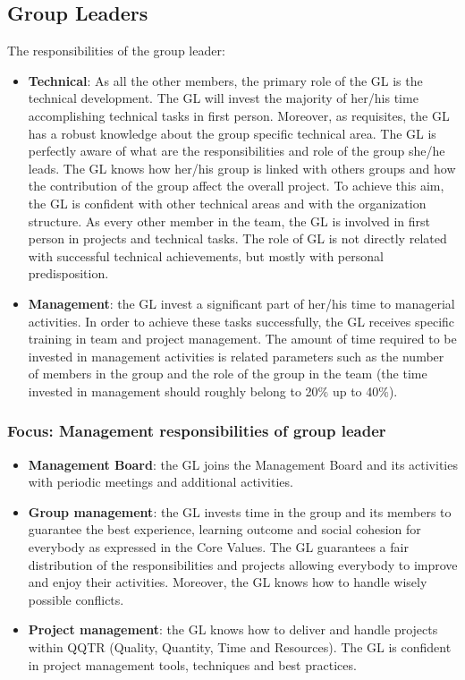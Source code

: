 \documentclass[graybox]{svmult}
\begin{document}
\subsection{Group Leaders}
The responsibilities of the group leader:
\begin{itemize}
\item \textbf{Technical}: As all the other members, the primary role of the GL is the technical development. The GL will invest the majority of her/his time accomplishing technical tasks in first person. Moreover, as requisites, the GL has a robust knowledge about the group specific technical area. The GL is perfectly aware of what are the responsibilities and role of the group she/he leads. The GL knows how her/his group is linked with others groups and how the contribution of the group affect the overall project. To achieve this aim, the GL is confident with other technical areas and with the organization structure. As every other member in the team, the GL is involved in first person in projects and technical tasks. The role of GL is not directly related with successful technical achievements, but mostly with personal predisposition.
\item \textbf{Management}: the GL invest a significant part of her/his time to managerial activities. In order to achieve these tasks successfully, the GL receives specific training in team and project management. The amount of time required to be invested in management activities is related parameters such as the number of members in the group and the role of the group in the team (the time invested in management should roughly belong to 20$\%$ up to 40$\%$).
\end{itemize}

\subsubsection{Focus: Management responsibilities of group leader}
\begin{itemize}
\item \textbf{Management Board}: the GL joins the Management Board and its activities with periodic meetings and additional activities.
\item \textbf{Group management}: the GL invests time in the group and its members to guarantee the best experience, learning outcome and social cohesion for everybody as expressed in the Core Values. The GL guarantees a fair distribution of the responsibilities and projects allowing everybody to improve and enjoy their activities. Moreover, the GL knows how to handle wisely possible conflicts.
\item \textbf{Project management}: the GL knows how to deliver and handle projects within QQTR (Quality, Quantity, Time and Resources). The GL is confident in project management tools, techniques and best practices.
\end{itemize}
    
\end{document}
